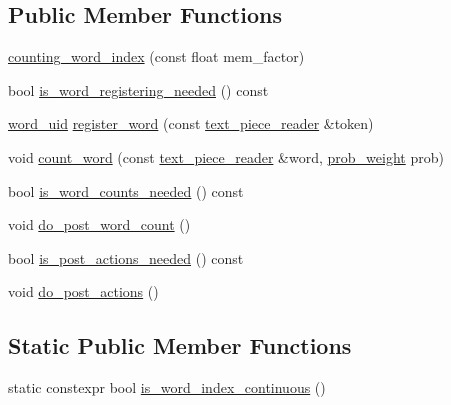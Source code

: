 \subsection*{Public Member Functions}
\begin{DoxyCompactItemize}
\item 
\hyperlink{classuva_1_1smt_1_1bpbd_1_1server_1_1lm_1_1dictionary_1_1counting__word__index_a45cc59a8b01a6969185abfe64e431f40}{counting\+\_\+word\+\_\+index} (const float mem\+\_\+factor)
\item 
bool \hyperlink{classuva_1_1smt_1_1bpbd_1_1server_1_1lm_1_1dictionary_1_1counting__word__index_a7b530630b019f9f9546ac2acf38d0d8b}{is\+\_\+word\+\_\+registering\+\_\+needed} () const 
\item 
\hyperlink{namespaceuva_1_1smt_1_1bpbd_1_1server_a6bfe45ba344d65a7fdd7d26156328ddc}{word\+\_\+uid} \hyperlink{classuva_1_1smt_1_1bpbd_1_1server_1_1lm_1_1dictionary_1_1counting__word__index_a2739b3c9a10c0f3a8049a0eb93dcc27f}{register\+\_\+word} (const \hyperlink{classuva_1_1utils_1_1file_1_1text__piece__reader}{text\+\_\+piece\+\_\+reader} \&token)
\item 
void \hyperlink{classuva_1_1smt_1_1bpbd_1_1server_1_1lm_1_1dictionary_1_1counting__word__index_a878be9916861dad5e3131b5d597d731c}{count\+\_\+word} (const \hyperlink{classuva_1_1utils_1_1file_1_1text__piece__reader}{text\+\_\+piece\+\_\+reader} \&word, \hyperlink{namespaceuva_1_1smt_1_1bpbd_1_1server_a01e9ea4de9c226f4464862e84ff0bbcc}{prob\+\_\+weight} prob)
\item 
bool \hyperlink{classuva_1_1smt_1_1bpbd_1_1server_1_1lm_1_1dictionary_1_1counting__word__index_a63889a048a4d71116c526fbf89f47fad}{is\+\_\+word\+\_\+counts\+\_\+needed} () const 
\item 
void \hyperlink{classuva_1_1smt_1_1bpbd_1_1server_1_1lm_1_1dictionary_1_1counting__word__index_a84cdef8ee880690c644b122bec2bc8d2}{do\+\_\+post\+\_\+word\+\_\+count} ()
\item 
bool \hyperlink{classuva_1_1smt_1_1bpbd_1_1server_1_1lm_1_1dictionary_1_1counting__word__index_ab89430f0d54c6de70b693386c1966a40}{is\+\_\+post\+\_\+actions\+\_\+needed} () const 
\item 
void \hyperlink{classuva_1_1smt_1_1bpbd_1_1server_1_1lm_1_1dictionary_1_1counting__word__index_a104d6e256540a23db472fe7de0f9bf5f}{do\+\_\+post\+\_\+actions} ()
\end{DoxyCompactItemize}
\subsection*{Static Public Member Functions}
\begin{DoxyCompactItemize}
\item 
static constexpr bool \hyperlink{classuva_1_1smt_1_1bpbd_1_1server_1_1lm_1_1dictionary_1_1counting__word__index_aa8ec0139749382322a9955bf645b00e6}{is\+\_\+word\+\_\+index\+\_\+continuous} ()
\end{DoxyCompactItemize}
